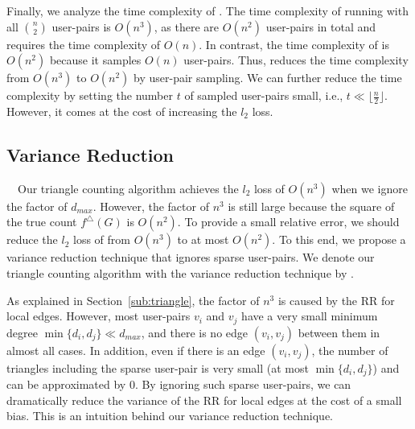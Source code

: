 Finally, we analyze the time complexity of \AlgWSTri{}. 
The time complexity of running \AlgWS{} with all $\binom{n}{2}$ user-pairs is $O(n^3)$, as there are $O(n^2)$ user-pairs in total and \AlgWS{} requires the time complexity of $O(n)$. 
In contrast, the time complexity of \AlgWSTri{} is $O(n^2)$ because it samples $O(n)$ user-pairs. 
Thus, \AlgWSTri{} reduces the time complexity from $O(n^3)$ to $O(n^2)$ by user-pair sampling. 
We can further reduce the time complexity by setting the number $t$ of sampled user-pairs small, i.e., $t \ll \lfloor \frac{n}{2} \rfloor$. 
However, it comes at the cost of increasing the $l_2$ loss. 

\subsection{Variance Reduction}
\label{sub:var_red}
~~Our 
triangle counting algorithm \AlgWSTri{} achieves the $l_2$ loss of $O(n^3)$ when we ignore the factor of $d_{max}$. 
However, the factor of $n^3$ is still large because the square of the true count $f^\triangle(G)$ is $O(n^2)$. 
To provide a small relative error, we should reduce the $l_2$ loss of \AlgWSTri{} from $O(n^3)$ to at most $O(n^2)$. 
To this end, we propose a variance reduction technique that ignores sparse user-pairs. 
We denote our triangle counting algorithm with the variance reduction technique by \AlgWSTriVR{}. 

As explained in Section~\ref{sub:triangle}, the factor of $n^3$ is caused by the RR for local edges. 
However, most user-pairs $v_i$ and $v_j$ have a very small minimum degree 
$\min\{d_i, d_j\} \ll d_{max}$, 
and there is no edge $(v_i, v_j)$ between them in almost all cases. 
In addition, even if there is an edge $(v_i, v_j)$, the number of triangles including the sparse user-pair is very small 
(at most $\min\{d_i, d_j\}$) 
and can be approximated by $0$. 
By ignoring such sparse user-pairs, we can dramatically reduce the variance of the RR for local edges at the cost of a small bias. 
This is an intuition behind our variance reduction technique. 

